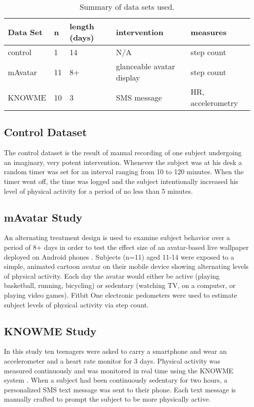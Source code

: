 \noindent
\begin{table}[H]
\resizebox{\columnwidth}{!} {
    \begin{tabular}{ l       |      l  |  p{1cm}      | l | l }
		  Data Set        & n  & length (days) & intervention    & measures \\
		  \hline
		  control         & 1  & 14 & N/A                       & step count         \\
		  mAvatar         & 11 & 8+ & glanceable avatar display & step count         \\
		  KNOWME          & 10 & 3  & SMS message               & HR, accelerometry  \\
    \end{tabular}
}
\caption {Summary of data sets used.}
\end{table}

\subsection{Control Dataset}
The control dataset is the result of manual recording of one subject undergoing an imaginary, very potent intervention.
Whenever the subject was at his desk a random timer was set for an interval ranging from 10 to 120 minutes.
When the timer went off, the time was logged and the subject intentionally increased his level of physical activity for a period of no less than 5 minutes.

\subsection{mAvatar Study}
An alternating treatment design is used to examine subject behavior over a period of 8+ days in order to test the effect size of an avatar-based live wallpaper deployed on Android phones \cite{murray2013}.
Subjects (n=11) aged 11-14 were exposed to a simple, animated cartoon avatar on their mobile device showing alternating levels of physical activity.
Each day the avatar would either be active (playing basketball, running, bicycling) or sedentary (watching TV, on a computer, or playing video games).
Fitbit One electronic pedometers were used to estimate subject levels of physical activity via step count.

\subsection{KNOWME Study}
In this study ten teenagers were asked to carry a smartphone and wear an accelerometer and a heart rate monitor for 3 days.
Physical activity was measured continuously and was monitored in real time using the KNOWME system \cite{mitra2012}.
When a subject had been continuously sedentary for two hours, a personalized SMS text message was sent to their phone.
Each text message is manually crafted to prompt the subject to be more physically active.


